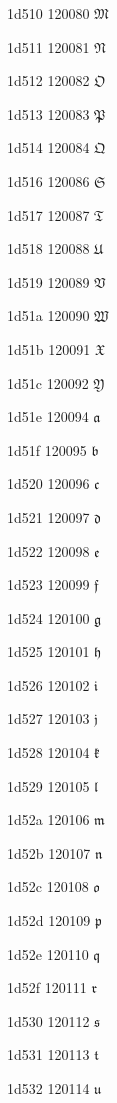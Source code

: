 \documentclass[11pt]{article}
\begin{document}
1d510 120080 \ensuremath{\mathfrak{M}}

1d511 120081 \ensuremath{\mathfrak{N}}

1d512 120082 \ensuremath{\mathfrak{O}}

1d513 120083 \ensuremath{\mathfrak{P}}

1d514 120084 \ensuremath{\mathfrak{Q}}

1d516 120086 \ensuremath{\mathfrak{S}}

1d517 120087 \ensuremath{\mathfrak{T}}

1d518 120088 \ensuremath{\mathfrak{U}}

1d519 120089 \ensuremath{\mathfrak{V}}

1d51a 120090 \ensuremath{\mathfrak{W}}

1d51b 120091 \ensuremath{\mathfrak{X}}

1d51c 120092 \ensuremath{\mathfrak{Y}}

1d51e 120094 \ensuremath{\mathfrak{a}}

1d51f 120095 \ensuremath{\mathfrak{b}}

1d520 120096 \ensuremath{\mathfrak{c}}

1d521 120097 \ensuremath{\mathfrak{d}}

1d522 120098 \ensuremath{\mathfrak{e}}

1d523 120099 \ensuremath{\mathfrak{f}}

1d524 120100 \ensuremath{\mathfrak{g}}

1d525 120101 \ensuremath{\mathfrak{h}}

1d526 120102 \ensuremath{\mathfrak{i}}

1d527 120103 \ensuremath{\mathfrak{j}}

1d528 120104 \ensuremath{\mathfrak{k}}

1d529 120105 \ensuremath{\mathfrak{l}}

1d52a 120106 \ensuremath{\mathfrak{m}}

1d52b 120107 \ensuremath{\mathfrak{n}}

1d52c 120108 \ensuremath{\mathfrak{o}}

1d52d 120109 \ensuremath{\mathfrak{p}}

1d52e 120110 \ensuremath{\mathfrak{q}}

1d52f 120111 \ensuremath{\mathfrak{r}}

1d530 120112 \ensuremath{\mathfrak{s}}

1d531 120113 \ensuremath{\mathfrak{t}}

1d532 120114 \ensuremath{\mathfrak{u}}
\end{document}
